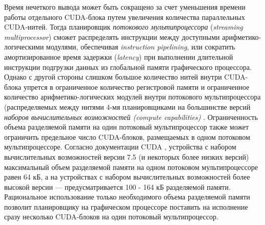 Время нечеткого вывода может быть сокращено за счет уменьшения времени работы отдельного CUDA-блока путем увеличения количества параллельных CUDA-нитей. Тогда планировщик \textit{потокового мультипроцессора} (\textit{streaming multiprocessor}) сможет распределять инструкции между доступными арифметико-логическими модулями, обеспечивая \textit{instruction pipelining}, или сократить амортизированное время задержки (\textit{latency}) при выполнении длительной инструкции подгрузки данных из глобальной памяти графического процессора. Однако с другой стороны слишком большое количество нитей внутри CUDA-блока упрется в ограниченное количество регистровой памяти и ограниченное количество арифметико-логических модулей внутри потокового мультипроцессора (распределяемых между нитями 4-мя планировщиками на большинстве версий \textit{наборов вычислительных возможностей (compute capabilities)} \cite{NvidiaComputeCapabilities}. Ограниченность объема разделяемой памяти на один потоковый мультипроцессор также может ограничить предельное число CUDA-блоков, размещаемых в одном потоковом мультипроцессоре. Согласно документации CUDA \cite{NvidiaCudaProgrammingGuide}, устройства с набором вычислительных возможностей версии 7.5 (и некоторых более низких версий) максимальный объем разделяемой памяти на одном потоковом мультипроцессоре равен 64 кБ, а на устройствах с набором вычислительных возможностей более высокой версии --- предусматривается 100 - 164 кБ разделяемой памяти. Рациональное использование только необходимого объема разделяемой памяти позволит планировщику на графическом процессоре поставить на исполнение сразу несколько CUDA-блоков на один потоковый мультипроцессор.

